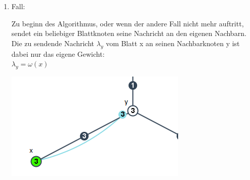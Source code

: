 \begin{enumerate}
\begin{enumerate}
		\end{enumerate}
		
	\item Fall:
		
		\begin{minipage}{0.55\textwidth} 
			Zu beginn des Algorithmus, oder wenn der andere Fall nicht mehr auftritt, sendet ein beliebiger Blattknoten seine Nachricht an den eigenen Nachbarn.\\
			
			Die zu sendende Nachricht $\lambda_{y}$ vom Blatt x an seinen Nachbarknoten y ist dabei nur das eigene Gewicht:\\
			$\lambda_{y} = \omega(x)$
		\end{minipage}
		\hfill
		\begin{minipage}{0.35\textwidth}
						
			\includegraphics[width=\textwidth]{bilder/abb_blattknoten.png}
		\end{minipage}
		
\end{enumerate}


